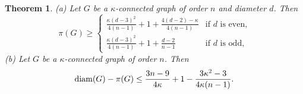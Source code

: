 \documentclass[a4paper,11pt]{article}
\newtheorem{theorem}{Theorem}[section]
\begin{document}
\begin{theorem}   \label{theo:diameter-vs-p-given-connectivity}
(a) Let $G$ be a $\kappa$-connected graph of order $n$ and diameter $d$. Then
\[
\pi(G) \geq \left\{ \begin{array}{cc} 
\frac{\kappa(d-3)^2}{4(n-1)} + 1 + \frac{4(d-2)-\kappa}{4(n-1)} & \textrm{if $d$ is even,} \\
\frac{\kappa(d-3)^2}{4(n-1)} + 1 + \frac{d-2}{n-1} & \textrm{if $d$ is odd,} 
\end{array} \right. 
\]
(b) Let $G$ be a $\kappa$-connected graph of order $n$. Then 
\[ {\rm diam}(G) - \pi(G) \leq  \frac{3n-9}{4\kappa } + 1  - \frac{3\kappa^2 - 3}{4\kappa(n-1)}. \] 
\end{theorem}
\end{document}
